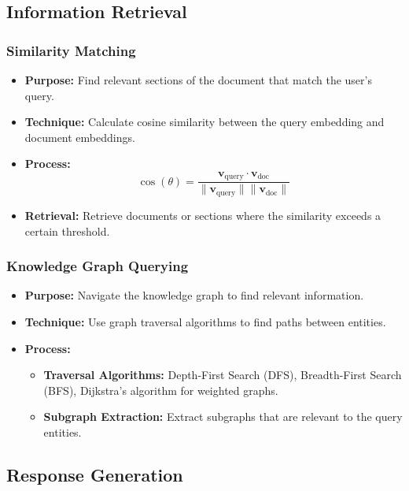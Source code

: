\documentclass[12pt]{article}
\begin{document}
\subsection{Information Retrieval}

\subsubsection{Similarity Matching}

\begin{itemize}
    \item \textbf{Purpose:} Find relevant sections of the document that match the user's query.
    \item \textbf{Technique:} Calculate cosine similarity between the query embedding and document embeddings.
    \item \textbf{Process:}
    \[
    \cos(\theta) = \frac{\mathbf{v}_{\text{query}} \cdot \mathbf{v}_{\text{doc}}}{\|\mathbf{v}_{\text{query}}\| \|\mathbf{v}_{\text{doc}}\|}
    \]
    \item \textbf{Retrieval:} Retrieve documents or sections where the similarity exceeds a certain threshold.
\end{itemize}

\subsubsection{Knowledge Graph Querying}

\begin{itemize}
    \item \textbf{Purpose:} Navigate the knowledge graph to find relevant information.
    \item \textbf{Technique:} Use graph traversal algorithms to find paths between entities.
    \item \textbf{Process:}
    \begin{itemize}
        \item \textbf{Traversal Algorithms:} Depth-First Search (DFS), Breadth-First Search (BFS), Dijkstra's algorithm for weighted graphs.
        \item \textbf{Subgraph Extraction:} Extract subgraphs that are relevant to the query entities.
    \end{itemize}
\end{itemize}

\subsection{Response Generation}
\end{document}

